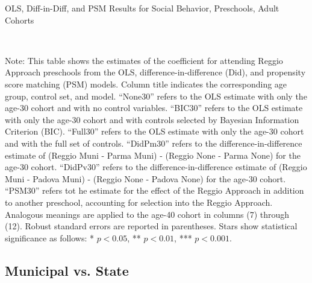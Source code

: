 \begin{landscape}
\begin{table}[H] \caption{OLS, Diff-in-Diff, and PSM Results for Social Behavior, Preschools, Adult Cohorts} \label{ols-S-reg}
\scalebox{0.80}{
}
\vspace{1ex} \\
\footnotesize\raggedright{Note: This table shows the estimates of the coefficient for attending Reggio Approach preschools from the OLS, difference-in-difference (Did), and propensity score matching (PSM) models. Column title indicates the corresponding age group, control set, and model. ``None30'' refers to the OLS estimate with only the age-30 cohort and with no control variables. ``BIC30'' refers to the OLS estimate with only the age-30 cohort and with controls selected by Bayesian Information Criterion (BIC). ``Full30'' refers to the OLS estimate with only the age-30 cohort and with the full set of controls. ``DidPm30'' refers to the difference-in-difference estimate of (Reggio Muni - Parma Muni) - (Reggio None - Parma None) for the age-30 cohort. ``DidPv30'' refers to the difference-in-difference estimate of (Reggio Muni - Padova Muni) - (Reggio None - Padova None) for the age-30 cohort. ``PSM30'' refers tot he estimate for the effect of the Reggio Approach in addition to another preschool, accounting for selection into the Reggio Approach. Analogous meanings are applied to the age-40 cohort in columns (7) through (12). Robust standard errors are reported in parentheses. Stars show statistical significance as follows: * $p < 0.05$, ** $p < 0.01$, *** $p < 0.001$.}
\end{table}









\subsection{Municipal vs. State}\label{appendix:state}

\end{landscape}
